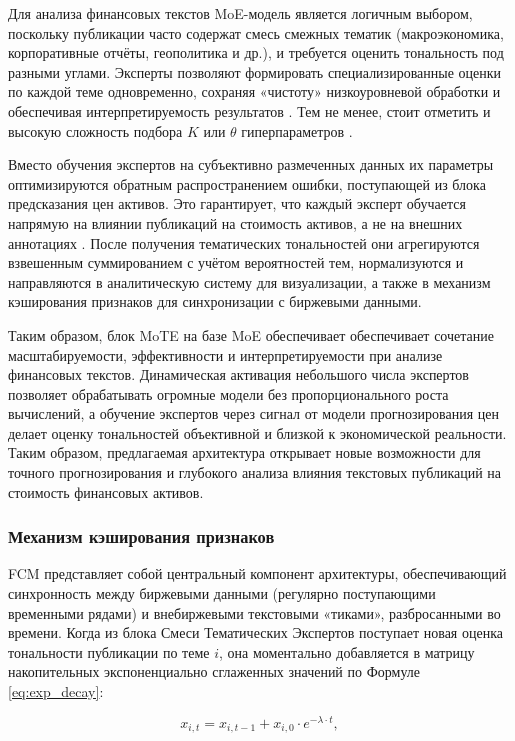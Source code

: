 Для анализа финансовых текстов MoE-модель является логичным выбором, поскольку публикации часто содержат смесь
смежных тематик (макроэкономика, корпоративные отчёты, геополитика и др.), и требуется оценить тональность
под разными углами. Эксперты позволяют формировать специализированные оценки по каждой теме одновременно,
сохраняя «чистоту» низкоуровневой обработки и обеспечивая интерпретируемость результатов \parencite{jacobs1991adaptive}.
Тем не менее, стоит отметить и высокую сложность подбора $K$ или $\theta$ гиперпараметров \parencite{jacobs1991adaptive}.

Вместо обучения экспертов на субъективно размеченных данных их параметры оптимизируются обратным распространением ошибки,
поступающей из блока предсказания цен активов. Это гарантирует, что каждый эксперт обучается напрямую на влиянии публикаций
на стоимость активов, а не на внешних аннотациях \parencite{shazeer2017outrageously}. После получения тематических тональностей
они агрегируются взвешенным суммированием с учётом вероятностей тем, нормализуются и направляются в аналитическую
систему для визуализации, а также в механизм кэширования признаков для синхронизации с биржевыми данными.

Таким образом, блок MoTE на базе MoE обеспечивает обеспечивает сочетание масштабируемости,
эффективности и интерпретируемости при анализе финансовых текстов. Динамическая активация небольшого числа
экспертов позволяет обрабатывать огромные модели без пропорционального роста вычислений, а обучение экспертов через
сигнал от модели прогнозирования цен делает оценку тональностей объективной и близкой к экономической реальности.
Таким образом, предлагаемая архитектура открывает новые возможности для точного прогнозирования и глубокого анализа
влияния текстовых публикаций на стоимость финансовых активов.

\subsubsection{Механизм кэширования признаков}
FCM представляет собой центральный компонент архитектуры, обеспечивающий синхронность между биржевыми данными
(регулярно поступающими временными рядами) и внебиржевыми текстовыми «тиками», разбросанными во времени.
Когда из блока Смеси Тематических Экспертов поступает новая оценка тональности публикации по теме $i$,
она моментально добавляется в матрицу накопительных экспоненциально сглаженных значений по Формуле \ref{eq:exp_decay}:

\begin{equation}\label{eq:exp_decay}
    x_{i,t}=x_{i, t-1} + x_{i, 0} \cdot e^{-\lambda \cdot t},
\end{equation}

